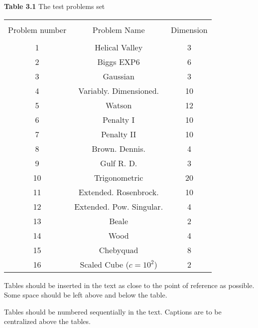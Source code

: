 \documentclass[twoside]{article}%
\begin{document}
\begin{center}
{\small {\bf Table 3.1} \quad The test problems set  \\    %
\vspace{1mm}
\doublerulesep 0.5pt
\begin{tabular}{ccc}
\hline\hline\\
[-3mm]
 Problem number & Problem Name & Dimension  \\
[.8mm]
 \hline
 \\[-3mm]
       1    &Helical Valley             &3    \\
       2    &Biggs EXP6                 &6    \\
       3    &Gaussian                   &3    \\
       4    &Variably. Dimensioned.     &10   \\
       5    &Watson                     &12   \\
       6    &Penalty I                  &10   \\
       7    &Penalty II                 &10   \\
       8    &Brown. Dennis.             &4    \\
       9    &Gulf R. D.                 &3    \\
       10   &Trigonometric              &20   \\
       11   &Extended. Rosenbrock.      &10   \\
       12   &Extended. Pow. Singular.   &4    \\
       13   &Beale                      &2    \\
       14   &Wood                       &4    \\
       15   &Chebyquad                  &8    \\
       16   &Scaled Cube ($c=10^2$)     &2    \\
[.8mm]
\hline\hline
\end{tabular}}
\end{center}
Tables should be inserted in the text as close to the point of
reference as possible. Some space should be left above and below
the table.

Tables should be numbered sequentially in the text.
Captions are to be centralized above the tables.
\end{document}
